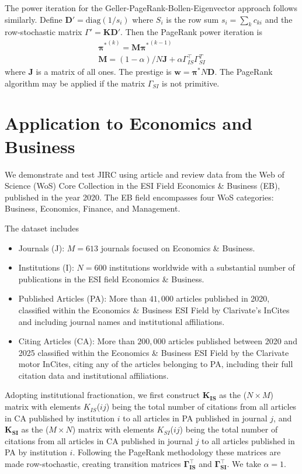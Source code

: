 \documentclass[10pt]{article}
\begin{document}
The power iteration for the Geller-PageRank-Bollen-Eigenvector approach follows similarly. Define $\mathbf{D'} = \text{diag} (1/s_i)$ where $S_i$ is the row sum $s_i = \sum_k c_{ki}$ and the row-stochastic matrix $\Gamma' = \mathbf{K}\mathbf{D'}$. Then the PageRank power iteration is  
\begin{align}
	\mathbf{\pi^*}^{(k)} = \mathbf{M} \mathbf{\pi^*}^{(k-1)} \\
	\mathbf{M} = (1-\alpha)/N \mathbf{J} + \alpha \Gamma_{IS}^\top\Gamma_{SI}^T
\end{align}
where $\mathbf{J}$ is a matrix of all ones. The prestige is $\mathbf{w} = \mathbf{\pi^*}N\mathbf{D}$. The PageRank algorithm may be applied if the matrix $\Gamma_{SI}$ is not primitive.

\section{Application to Economics and Business}
We demonstrate and test JIRC using article and review data from the Web of Science (WoS) Core Collection in the ESI Field Economics \& Business (EB), published in the year 2020. The EB field encompasses four WoS categories: Business, Economics, Finance, and Management.

The dataset includes
\begin{itemize}
\item Journals (J): $M =613$ journals focused on Economics \& Business.
\item Institutions (I): $N =600$ institutions worldwide with a substantial number of publications in the ESI field Economics \& Business.
\item Published Articles (PA): More than $41,000$ articles published in 2020, classified within the Economics \& Business ESI Field by Clarivate's InCites and including journal names and institutional affiliations.
\item Citing Articles (CA): More than $200,000$ articles published between 2020 and 2025  classified within the Economics \& Business ESI Field by the Clarivate motor InCites, citing any of the  articles belonging to PA, including their full citation data and institutional affiliations.
\end{itemize}

Adopting institutional fractionation, we first construct $\mathbf{K_{IS}}$ as the ($N \times M$) matrix with elements $K_{IS}$($ij$) being the total number of citations from all articles in CA published by institution $i$ to all articles in PA published in journal $j$, and $\mathbf{K_{SI}}$ as the ($M \times N$) matrix with elements $K_{SI}$($ij$) being the total number of citations from all articles in CA published in journal $j$ to all articles published in PA by institution $i$. Following the PageRank methodology these matrices are made row-stochastic, creating transition matrices $\mathbf{\Gamma_{IS}^\top}$ and $\mathbf{\Gamma_{SI}^\top}$. We take $\alpha = 1$. 
\end{document}
